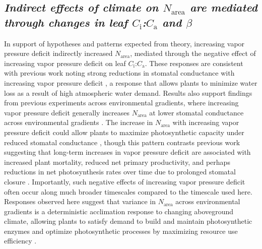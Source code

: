 \subsection{\textit{Indirect effects of climate on $N_\mathrm{area}$ are mediated through changes in leaf $C_\mathrm{i}$:$C_\mathrm{a}$ and $\beta$}}
\noindent In support of hypotheses and patterns expected from theory, increasing vapor pressure deficit indirectly increased $N_\mathrm{area}$, mediated through the negative effect of increasing vapor pressure deficit on leaf $C_\mathrm{i}$:$C_\mathrm{a}$. These responses are consistent with previous work noting strong reductions in stomatal conductance with increasing vapor pressure deficit , a response that allows plants to minimize water loss as a result of high atmospheric water demand. Results also support findings from previous experiments across environmental gradients, where increasing vapor pressure deficit generally increases $N_\mathrm{area}$ at lower stomatal conductance across environmental gradients . The increase in $N_\mathrm{area}$ with increasing vapor pressure deficit could allow plants to maximize photosynthetic capacity under reduced stomatal conductance , though this pattern contrasts previous work suggesting that long-term increases in vapor pressure deficit are associated with increased plant mortality, reduced net primary productivity, and perhaps reductions in net photosynthesis rates over time due to prolonged stomatal closure . Importantly, such negative effects of increasing vapor pressure deficit often occur along much broader timescales compared to the timescale used here.  Responses observed here suggest that variance in $N_\mathrm{area}$ across environmental gradients is a deterministic acclimation response to changing aboveground climate, allowing plants to satisfy demand to build and maintain photosynthetic enzymes and optimize photosynthetic processes by maximizing resource use efficiency .

